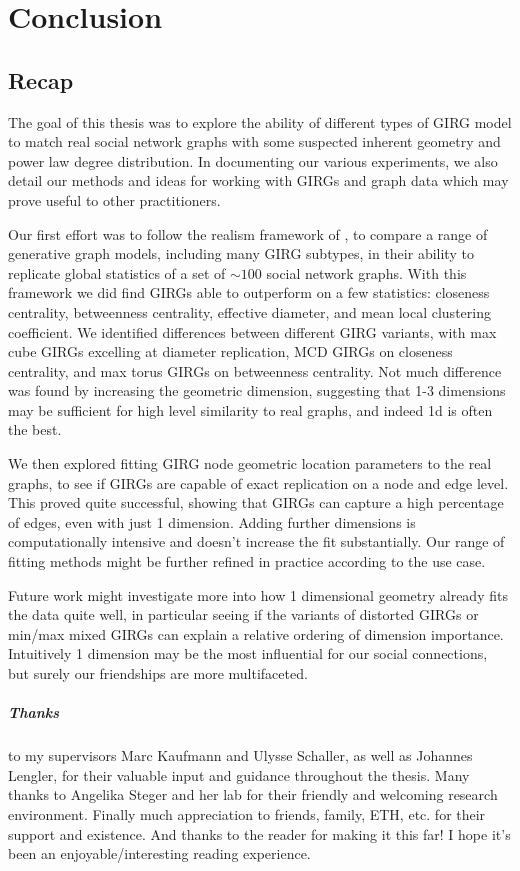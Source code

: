 \chapter{Conclusion}
\minitoc
\section{Recap}
The goal of this thesis was to explore the ability of different types of GIRG model to match real social network graphs with some suspected inherent geometry and power law degree distribution. In documenting our various experiments, we also detail our methods and ideas for working with GIRGs and graph data which may prove useful to other practitioners.

Our first effort was to follow the realism framework of \cite{blasius2018towards}, to compare a range of generative graph models, including many GIRG subtypes, in their ability to replicate global statistics of a set of $\sim 100$ social network graphs.
With this framework we did find GIRGs able to outperform on a few statistics: closeness centrality, betweenness centrality, effective diameter, and mean local clustering coefficient. We identified differences between different GIRG variants, with max cube GIRGs excelling at diameter replication, MCD GIRGs on closeness centrality, and max torus GIRGs on betweenness centrality. Not much difference was found by increasing the geometric dimension, suggesting that 1-3 dimensions may be sufficient for high level similarity to real graphs, and indeed 1d is often the best.

We then explored fitting GIRG node geometric location parameters to the real graphs, to see if GIRGs are capable of exact replication on a node and edge level. This proved quite successful, showing that GIRGs can capture a high percentage of edges, even with just 1 dimension. Adding further dimensions is computationally intensive and doesn't increase the fit substantially. Our range of fitting methods might be further refined in practice according to the use case. 

Future work might investigate more into how 1 dimensional geometry already fits the data quite well, in particular seeing if the variants of distorted GIRGs or min/max mixed GIRGs can explain a relative ordering of dimension importance. Intuitively 1 dimension may be the most influential for our social connections, but surely our friendships are more multifaceted.


\paragraph{Thanks} to my supervisors Marc Kaufmann and Ulysse Schaller, as well as Johannes Lengler, for their valuable input and guidance throughout the thesis. Many thanks to Angelika Steger and her lab for their friendly and welcoming research environment. Finally much appreciation to friends, family, ETH, etc. for their support and existence. And thanks to the reader for making it this far! I hope it's been an enjoyable/interesting reading experience.





